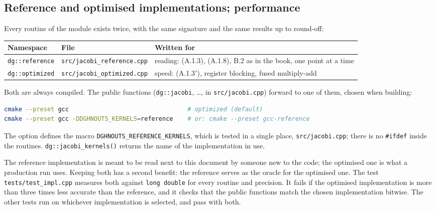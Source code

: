 \documentclass[11pt,a4paper]{article}
\newcommand{\code}[1]{\texttt{#1}}
\begin{document}
\subsection{Reference and optimised implementations; performance}
\label{sec:performance}

Every routine of the module exists twice, with the same signature and the
same results up to round-off:
\begin{center}
\small
\begin{tabular}{@{}ll>{\raggedright\arraybackslash}p{}@{}}
\toprule
Namespace & File & Written for \\
\midrule
\code{dg::reference} & \code{src/jacobi\_reference.cpp} & reading: (A.1.3), (A.1.8), B.2 as in the book, one point at a time \\
\code{dg::optimized} & \code{src/jacobi\_optimized.cpp} & speed: (A.1.3$'$), register blocking, fused multiply-add \\
\bottomrule
\end{tabular}
\end{center}
Both are always compiled. The public functions (\code{dg::jacobi}, \dots,
in \code{src/jacobi.cpp}) forward to one of them, chosen when building:
\begin{lstlisting}[language=bash]
cmake --preset gcc                                 # optimized (default)
cmake --preset gcc -DDGHNOUTS_KERNELS=reference    # or: cmake --preset gcc-reference
\end{lstlisting}
The option defines the macro \code{DGHNOUTS\_REFERENCE\_KERNELS}, which is
tested in a single place, \code{src/jacobi.cpp}; there is no \code{\#ifdef}
inside the routines. \code{dg::jacobi\_kernels()} returns the name of the
implementation in use.

The reference implementation is meant to be read next to this document by
someone new to the code; the optimised one is what a production run uses.
Keeping both has a second benefit: the reference serves as the oracle for the
optimised one. The test \code{tests/test\_impl.cpp} measures both against
\code{long double} for every routine and precision. It fails if the optimised
implementation is more than three times less accurate than the reference,
and it checks that the public functions match the chosen implementation
bitwise. The other tests run on whichever implementation is selected, and pass
with both.
\end{document}
